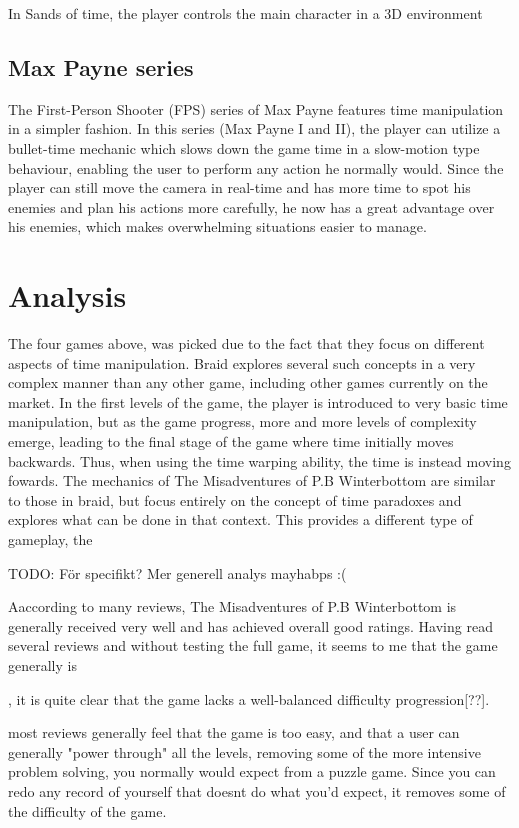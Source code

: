 In Sands of time, the player controls the main character in a 3D environment 

\subsection{Max Payne series}
The First-Person Shooter (FPS) series of Max Payne features time manipulation in a simpler fashion. In this series (Max Payne I and II), 
the player can utilize a bullet-time mechanic which slows down the game time in a slow-motion type behaviour, enabling the user to perform any action he normally would.
Since the player can still move the camera in real-time and has more time to spot his enemies and plan his actions more carefully, 
he now has a great advantage over his enemies, which makes overwhelming situations easier to manage. 


\section{Analysis}

The four games above, was picked due to the fact that they focus on different aspects of time manipulation. Braid explores several such concepts in a very complex manner than any other game, including other games currently on the market. In the first levels of the game, the player is introduced to very basic time manipulation, but as the game progress, more and more levels of complexity emerge, leading to the final stage of the game where time initially moves backwards. Thus, when using the time warping ability, the time is instead moving fowards. The mechanics of The Misadventures of P.B Winterbottom are similar to those in braid, but focus entirely on the concept of time paradoxes and explores what can be done in that context. This provides a different type of gameplay, the 


TODO: För specifikt? Mer generell analys mayhabps :(

Aaccording to many reviews, The Misadventures of P.B Winterbottom is generally received very well and has achieved overall good ratings. Having read several reviews and without testing the full game, it seems to me that the game generally is 

, it is quite clear that the game lacks a well-balanced difficulty progression[??]. 

most reviews generally feel that the game is too easy,
 and that a user can generally "power through" all the levels, removing some of the more intensive problem solving, you normally would expect from a puzzle game. Since you can
 redo any record of yourself that doesnt do what you'd expect, it removes some of the difficulty of the game.
